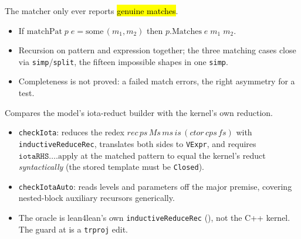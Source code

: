 \begin{example}
  \label{thm:iotashape-matchpat-sound}
  \leanok

   The matcher only ever reports \hl{genuine matches}.
  \begin{itemize}
  \item If $\mathrm{matchPat}\;p\;e=\mathrm{some}\,(m_1,m_2)$ then $p.\mathrm{Matches}\;e\;m_1\;
        m_2$.
  \item {} Recursion on pattern and expression together; the three matching cases close
        via \texttt{simp}/\texttt{split}, the fifteen impossible shapes in one \texttt{simp}.
  \item {} Completeness is not proved: a failed match errors, the right asymmetry for a
        test.
  \end{itemize}
\end{example}

\begin{example}
  \label{def:iotashape-checkiota}
  \leanok

   Compares the model's iota-reduct builder with the kernel's own reduction.
  \begin{itemize}
  \item \texttt{checkIota}: reduces the redex $rec\,ps\,Ms\,ms\,is\,(ctor\,cps\,fs)$ with
        \texttt{inductiveReduceRec}, translates both sides to \texttt{VExpr}, and requires
        $\mathtt{iotaRHS}\dots.\mathrm{apply}$ at the matched pattern to equal the kernel's reduct
        \emph{syntactically} (the stored template must be \texttt{Closed}).
  \item \texttt{checkIotaAuto}: reads levels and parameters off the major premise, covering
        nested-block auxiliary recursors generically.
  \item {} The oracle is lean4lean's own \texttt{inductiveReduceRec}
        (), not the C++ kernel. The guard at
         is a \texttt{trproj} edit.
  \end{itemize}
\end{example}

